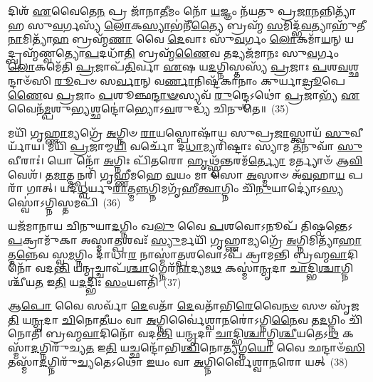 𑌦𑌿𑌶᳴ \ul{𑌏}\-𑌵𑍈𑌤𑍇\-\ul{𑌨} 𑌪𑍍𑌰 𑌜𑌾᳴𑌨𑌾\-\ul{𑌤𑍀}\-𑌮𑌂 𑌨𑍋᳴ \ul{𑌯}\-𑌜𑍍𑌞𑌂 𑌨᳴𑌯𑌤𑍁 𑌪𑍍𑌰\-\ul{𑌜𑌾}\-𑌨𑌨𑍍𑌨𑌿𑌤𑍍𑌯𑌾᳴𑌹 𑌸𑍁\-\ul{𑌵}\-𑌰𑍍𑌗𑌸𑍍𑌯᳴ \ul{𑌲𑍋}\-𑌕\-\ul{𑌸𑍍𑌯𑌾}\-𑌭॑𑌨𑍀᳴\-\ul{𑌤𑍍𑌯𑍈} 𑌬𑍍𑌰𑌹𑍍𑌮᳴ \ul{𑌸}\-𑌮𑌿𑌦𑍍𑌭᳴\-\ul{𑌵}\-𑌤𑍍𑌯𑌾𑌹𑍁᳴𑌤𑍀\-\ul{𑌨𑌾}\-𑌮𑌿𑌤𑍍𑌯𑌾᳴\-\ul{𑌹} 𑌬𑍍𑌰𑌹𑍍𑌮᳴\-\ul{𑌣𑌾} 𑌵𑍈 \ul{𑌦𑍇}\-𑌵𑌾𑌃 𑌸𑍁᳴\-\ul{𑌵}\-𑌰𑍍𑌗𑌂 \ul{𑌲𑍋}\-𑌕𑌮𑌾᳴\-\ul{𑌯}\-𑌨𑍍 𑌯𑌦𑍍𑌬𑍍𑌰𑌹𑍍𑌮᳴𑌣𑍍𑌵𑌤𑍍𑌯𑍋\-\ul{𑌪}\-𑌦𑌧𑌾᳴\-\ul{𑌤𑌿} 𑌬𑍍𑌰𑌹𑍍𑌮᳴\-\ul{𑌣𑍈}\-𑌵 𑌤𑌦𑍍𑌯𑌜᳴𑌮𑌾𑌨𑌃 𑌸𑍁\-\ul{𑌵}\-𑌰𑍍𑌗𑌂 \ul{𑌲𑍋}\-𑌕𑌮𑍇᳴𑌤𑌿 \ul{𑌪𑍍𑌰}\-𑌜𑌾𑌪᳴\-\ul{𑌤𑌿}\-𑌰𑍍𑌵𑌾 \ul{𑌏}\-𑌷 𑌯\-\ul{𑌦}\-𑌗𑍍𑌨𑌿𑌸𑍍𑌤𑌸𑍍𑌯᳴ \ul{𑌪𑍍𑌰}\-𑌜𑌾𑌃 \ul{𑌪}\-𑌶\-\ul{𑌵}\-𑌶𑍍𑌛𑌨𑍍𑌦𑌾𑍞᳴𑌸𑌿 \ul{𑌰𑍂}\-𑌪𑍞 𑌸\-\ul{𑌰𑍍𑌵𑌾}\-𑌨𑍍 𑌵\-\ul{𑌰𑍍𑌣𑌾}\-𑌨𑌿𑌷𑍍𑌟᳴𑌕𑌾𑌨𑌾𑌂 𑌕𑍁𑌰𑍍𑌯𑌾\-\ul{𑌦𑍍𑌰𑍂}\-𑌪𑍇\-\ul{𑌣𑍈}\-𑌵 \ul{𑌪𑍍𑌰}\-𑌜𑌾𑌂 \ul{𑌪}\-𑌶𑍂𑌞𑍍𑌛\-\ul{𑌨𑍍𑌦𑌾}\-\-\ul{𑍟}\-𑌸𑍍𑌯𑌵᳴ \ul{𑌰𑍁}\-𑌨𑍍𑌦𑍍𑌧𑍇\-𑌽𑌥𑍋॑ \ul{𑌪𑍍𑌰}\-𑌜𑌾𑌭𑍍𑌯᳴ \ul{𑌏}\-𑌵𑍈𑌨᳴\-\ul{𑌮𑍍𑌪}\-𑌶𑍁\-\ul{𑌭𑍍𑌯}\-𑌶𑍍𑌛𑌨𑍍𑌦𑍋॑𑌭𑍍𑌯𑍋\-𑌽\-\ul{𑌵}\-𑌰𑍁𑌦𑍍𑌧𑍍𑌯᳴ 𑌚𑌿𑌨𑍁𑌤𑍇॥~(35)

{\anuvakamend[{𑌯𑌾\-\ul{𑌨𑍍𑌯}\-𑌗𑍍𑌨\-\ul{𑌯} 𑌇\-\ul{𑌤𑍍𑌯𑌾}\-𑌹𑍇𑌷𑍍𑌟᳴𑌕𑌾\-\ul{𑌨𑌾}\-\-\ul{𑍞} 𑌷𑍋𑌡᳴𑌶 𑌚}]}%

𑌮𑌯𑌿᳴ 𑌗𑍃\-\ul{𑌹𑍍𑌣𑌾}\-𑌮𑍍𑌯𑌗𑍍𑌰𑍇᳴ \ul{𑌅}\-𑌗𑍍𑌨𑌿𑍞 \ul{𑌰𑌾}\-𑌯𑌸𑍍𑌪𑍋𑌷𑌾᳴𑌯 𑌸𑍁𑌪𑍍𑌰\-\ul{𑌜𑌾}\-𑌸𑍍𑌤𑍍𑌵𑌾𑌯᳴ \ul{𑌸𑍁}\-𑌵𑍀𑌰𑍍𑌯𑌾᳴𑌯। 𑌮𑌯𑌿᳴ \ul{𑌪𑍍𑌰}\-𑌜𑌾𑌮𑍍𑌮\-\ul{𑌯𑌿} 𑌵𑌰𑍍𑌚𑍋᳴ 𑌦\-\ul{𑌧𑌾}\-𑌮𑍍𑌯𑌰𑌿᳴𑌷𑍍𑌟𑌾𑌃 𑌸𑍍𑌯𑌾𑌮 \ul{𑌤}\-𑌨𑍁𑌵𑌾᳴ \ul{𑌸𑍁}\-𑌵𑍀𑌰𑌾𑌃॑। 𑌯𑍋 𑌨𑍋᳴ \ul{𑌅}\-𑌗𑍍𑌨𑌿𑌃 𑌪𑌿᳴𑌤𑌰𑍋 \ul{𑌹𑍃}\-𑌥𑍍𑌸𑍍𑌵᳴𑌨𑍍𑌤𑌰𑌮᳴\-\ul{𑌰𑍍𑌤𑍍𑌯𑍋} 𑌮𑌰𑍍𑌤𑍍𑌯𑌾𑍞᳴ 𑌆\-\ul{𑌵𑌿}\-𑌵𑍇𑌶᳴। 𑌤\-\ul{𑌮𑌾}\-𑌤𑍍𑌮𑌨𑍍𑌪𑌰𑌿᳴ 𑌗𑍃𑌹𑍍𑌣𑍀𑌮𑌹𑍇 \ul{𑌵}\-𑌯𑌂 𑌮𑌾 𑌸𑍋 \ul{𑌅}\-𑌸𑍍𑌮𑌾𑍞 𑌅᳴\-\ul{𑌵}\-𑌹𑌾\-\ul{𑌯} 𑌪𑌰𑌾᳴ 𑌗𑌾𑌤𑍍। 𑌯𑌦᳴\-\ul{𑌧𑍍𑌵}\-𑌰𑍍𑌯𑍁\-\ul{𑌰𑌾}\-𑌤𑍍𑌮\-\ul{𑌨𑍍𑌨}\-𑌗𑍍𑌨𑌿𑌮𑌗𑍃᳴𑌹𑍀\-\ul{𑌤𑍍𑌵𑌾}\-𑌗𑍍𑌨𑌿𑌂 𑌚𑌿᳴\-\ul{𑌨𑍁}\-𑌯𑌾𑌦𑍍𑌯𑍋॑\-𑌽\-\ul{𑌸𑍍𑌯} 𑌸𑍍𑌵𑍋॑\-𑌽𑌗𑍍𑌨𑌿𑌸𑍍𑌤𑌮𑌪𑌿᳴~(36)

𑌯𑌜᳴𑌮𑌾𑌨𑌾𑌯 𑌚𑌿𑌨𑍁𑌯𑌾\-\ul{𑌦}\-𑌗𑍍𑌨𑌿𑌂 𑌖\-\ul{𑌲𑍁} 𑌵𑍈 \ul{𑌪}\-𑌶𑌵𑍋\-𑌽𑌨𑍂𑌪᳴ 𑌤𑌿𑌷𑍍𑌠𑌨𑍍𑌤𑍇\-𑌽\-\ul{𑌪}\-𑌕𑍍𑌰𑌾𑌮𑍁᳴𑌕𑌾 𑌅𑌸𑍍𑌮𑌾\-\ul{𑌤𑍍𑌪}\-𑌶𑌵𑌃᳴ \ul{𑌸𑍍𑌯𑍁}\-𑌰𑍍𑌮𑌯𑌿᳴ 𑌗𑍃𑌹𑍍𑌣𑌾𑌮𑍍𑌯𑌗𑍍𑌰𑍇᳴ \ul{𑌅}\-𑌗𑍍𑌨𑌿𑌮𑌿𑌤𑍍𑌯𑌾᳴\-\ul{𑌹𑌾}\-𑌤𑍍𑌮\-\ul{𑌨𑍍𑌨𑍇}\-𑌵 𑌸𑍍𑌵\-\ul{𑌮}\-𑌗𑍍𑌨𑌿𑌂 𑌦𑌾᳴𑌧𑌾\-\ul{𑌰} 𑌨𑌾𑌸𑍍𑌮𑌾॑\-\ul{𑌤𑍍𑌪}\-𑌶𑌵𑍋\-𑌽𑌪᳴ 𑌕𑍍𑌰𑌾𑌮𑌨𑍍𑌤𑌿 𑌬𑍍𑌰𑌹𑍍𑌮\-\ul{𑌵𑌾}\-𑌦𑌿𑌨𑍋᳴ 𑌵𑌦\-\ul{𑌨𑍍𑌤𑌿} 𑌯𑌨𑍍𑌮𑍃𑌚𑍍𑌚𑌾𑌪᳴\-\ul{𑌶𑍍𑌚𑌾}\-𑌗𑍍𑌨𑍇𑌰᳴\-\ul{𑌨𑌾}\-𑌦𑍍𑌯𑌮\-\ul{𑌥} 𑌕𑌸𑍍𑌮𑌾॑\-\ul{𑌨𑍍𑌮𑍃}\-𑌦𑌾 \ul{𑌚𑌾}\-𑌦𑍍𑌭𑌿\-\ul{𑌶𑍍𑌚𑌾}\-𑌗𑍍𑌨𑌿𑌶𑍍𑌚𑍀᳴𑌯\-\ul{𑌤} 𑌇\-\ul{𑌤𑌿} 𑌯\-\ul{𑌦}\-𑌦𑍍𑌭𑌿𑌃 \ul{𑌸𑌂}\-𑌯𑍗𑌤𑌿᳴~(37)

𑌆\-\ul{𑌪𑍋} 𑌵𑍈 𑌸𑌰𑍍𑌵𑌾᳴ \ul{𑌦𑍇}\-𑌵𑌤𑌾᳴ \ul{𑌦𑍇}\-𑌵𑌤𑌾᳴𑌭𑌿\-\ul{𑌰𑍇}\-𑌵𑍈\-\ul{𑌨}\-\-\ul{𑍞} 𑌸𑍞 𑌸𑍃᳴𑌜\-\ul{𑌤𑌿} 𑌯\-\ul{𑌨𑍍𑌮𑍃}\-𑌦𑌾 \ul{𑌚𑌿}\-𑌨𑍋\-\ul{𑌤𑍀}\-𑌯𑌂 𑌵𑌾 \ul{𑌅}\-𑌗𑍍𑌨𑌿𑌰𑍍𑌵𑍈॑𑌶𑍍𑌵𑌾\-\ul{𑌨}\-𑌰𑍋॑\-𑌽𑌗𑍍𑌨𑌿\-\ul{𑌨𑍈}\-𑌵 𑌤\-\ul{𑌦}\-𑌗𑍍𑌨𑌿𑌂 𑌚𑌿᳴𑌨𑍋𑌤𑌿 𑌬𑍍𑌰𑌹𑍍𑌮\-\ul{𑌵𑌾}\-𑌦𑌿𑌨𑍋᳴ 𑌵𑌦\-\ul{𑌨𑍍𑌤𑌿} 𑌯\-\ul{𑌨𑍍𑌮𑍃}\-𑌦𑌾 \ul{𑌚𑌾}\-𑌦𑍍𑌭𑌿\-\ul{𑌶𑍍𑌚𑌾}\-𑌗𑍍𑌨𑌿\-\ul{𑌶𑍍𑌚𑍀}\-𑌯𑌤𑍇\-𑌽\-\ul{𑌥} 𑌕𑌸𑍍𑌮𑌾᳴\-\ul{𑌦}\-𑌗𑍍𑌨𑌿𑌰𑍁᳴𑌚𑍍𑌯\-\ul{𑌤} 𑌇\-\ul{𑌤𑌿} 𑌯𑌚𑍍𑌛𑌨𑍍𑌦𑍋᳴𑌭𑌿\-\ul{𑌶𑍍𑌚𑌿}\-𑌨𑍋\-\ul{𑌤𑍍𑌯}\-𑌗𑍍𑌨\-\ul{𑌯𑍋} 𑌵𑍈 𑌛𑌨𑍍𑌦𑌾𑍞᳴\-\ul{𑌸𑌿} 𑌤𑌸𑍍𑌮𑌾᳴\-\ul{𑌦}\-𑌗𑍍𑌨𑌿𑌰𑍁᳴\-\ul{𑌚𑍍𑌯}\-𑌤𑍇\-𑌽𑌥𑍋᳴ \ul{𑌇}\-𑌯𑌂 𑌵𑌾 \ul{𑌅}\-𑌗𑍍𑌨𑌿𑌰𑍍𑌵𑍈॑𑌶𑍍𑌵𑌾\-\ul{𑌨}\-𑌰𑍋 𑌯𑌤𑍍~(38)

